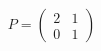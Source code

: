 \documentclass[preview]{standalone}
\begin{document}
\begin{align*}
P = \begin{pmatrix} 2 & 1 \\ 0 & 1 \end{pmatrix}
\end{align*}
\end{document}
